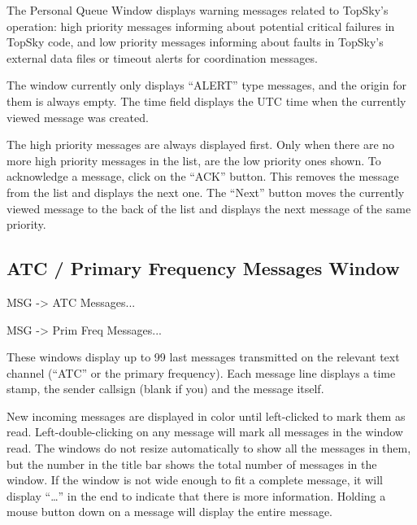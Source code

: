\documentclass[a4paper,oneside,11pt]{memoir}
\begin{document}
The Personal Queue Window displays warning messages related to TopSky’s operation: high priority messages informing about potential critical failures in TopSky code, and low priority messages informing about faults in TopSky’s external data files or timeout alerts for coordination messages.

\bigskip

The window currently only displays “ALERT” type messages, and the origin for them is always empty. The time field displays the UTC time when the currently viewed message was created.

\bigskip

The high priority messages are always displayed first. Only when there are no more high priority messages in the list, are the low priority ones shown. To acknowledge a message, click on the “ACK” button. This removes the message from the list and displays the next one. The “Next” button moves the currently viewed message to the back of the list and displays the next message of the same priority.

\subsection{ATC / Primary Frequency Messages Window}
\label{win:atcmw}
\label{win:pfmw}

 MSG -> ATC Messages...

 MSG -> Prim Freq Messages...

\bigskip


These windows display up to 99 last messages transmitted on the relevant text channel (“ATC” or the primary frequency). Each message line displays a time stamp, the sender callsign (blank if you) and the message itself.

\bigskip

New incoming messages are displayed in  color until left-clicked to mark them as read. Left-double-clicking on any message will mark all messages in the window read. The windows do not resize automatically to show all the messages in them, but the number in the title bar shows the total number of messages in the window. If the window is not wide enough to fit a complete message, it will display “…” in the end to indicate that there is more information. Holding a mouse button down on a message will display the entire message.
\end{document}
